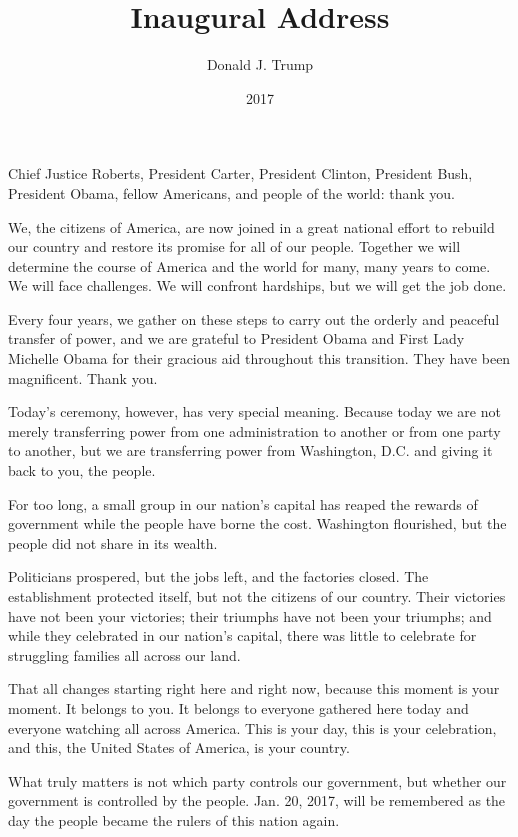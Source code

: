 \documentclass[10pt,a4paper]{article}
\begin{document}
\title{Inaugural Address}
\date{2017}
\author{Donald J. Trump}
\maketitle
    
\thispagestyle{plain}
\setcounter{page}{1}
\linenumbers
\noindent Chief Justice Roberts, President Carter, President Clinton, President Bush, President Obama, fellow Americans, and people of the world: thank you.

We, the citizens of America, are now joined in a great national effort to rebuild our country and restore its promise for all of our people. Together we will determine the course of America and the world for many, many years to come. We will face challenges. We will confront hardships, but we will get the job done.

Every four years, we gather on these steps to carry out the orderly and peaceful transfer of power, and we are grateful to President Obama and First Lady Michelle Obama for their gracious aid throughout this transition. They have been magnificent. Thank you.

Today's ceremony, however, has very special meaning. Because today we are not merely transferring power from one administration to another or from one party to another, but we are transferring power from Washington, D.C. and giving it back to you, the people.

For too long, a small group in our nation's capital has reaped the rewards of government while the people have borne the cost. Washington flourished, but the people did not share in its wealth.

Politicians prospered, but the jobs left, and the factories closed. The establishment protected itself, but not the citizens of our country. Their victories have not been your victories; their triumphs have not been your triumphs; and while they celebrated in our nation's capital, there was little to celebrate for struggling families all across our land.

That all changes starting right here and right now, because this moment is your moment. It belongs to you. It belongs to everyone gathered here today and everyone watching all across America. This is your day, this is your celebration, and this, the United States of America, is your country.

What truly matters is not which party controls our government, but whether our government is controlled by the people. Jan. 20, 2017, will be remembered as the day the people became the rulers of this nation again.
\end{document}
